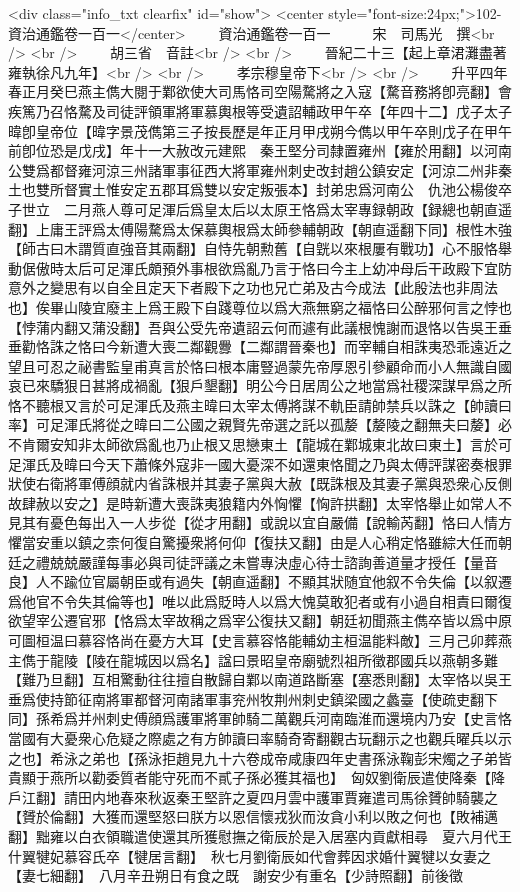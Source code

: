 <div class="info_txt clearfix" id="show">
<center style="font-size:24px;">102-資治通鑑卷一百一</center>
  　　資治通鑑卷一百一　　　宋　司馬光　撰<br />
<br />
　　胡三省　音註<br />
<br />
　　晉紀二十三【起上章涒灘盡著雍執徐凡九年】<br />
<br />
　　孝宗穆皇帝下<br />
<br />
　　升平四年春正月癸巳燕主儁大閱于鄴欲使大司馬恪司空陽騖將之入寇【騖音務將卽亮翻】會疾篤乃召恪騖及司徒評領軍將軍慕輿根等受遺詔輔政甲午卒【年四十二】戊子太子暐卽皇帝位【暐字景茂儁第三子按長歷是年正月甲戌朔今儁以甲午卒則戊子在甲午前卽位恐是戊戌】年十一大赦改元建熙　秦王堅分司隸置雍州【雍於用翻】以河南公雙爲都督雍河涼三州諸軍事征西大將軍雍州刺史改封趙公鎮安定【河涼二州非秦土也雙所督實土惟安定五郡耳爲雙以安定叛張本】封弟忠爲河南公　仇池公楊俊卒子世立　二月燕人尊可足渾后爲皇太后以太原王恪爲太宰專録朝政【録總也朝直遥翻】上庸王評爲太傅陽騖爲太保慕輿根爲太師參輔朝政【朝直遥翻下同】根性木強【師古曰木謂質直強音其兩翻】自恃先朝勲舊【自皝以來根屢有戰功】心不服恪舉動倨傲時太后可足渾氏頗預外事根欲爲亂乃言于恪曰今主上幼冲母后干政殿下宜防意外之變思有以自全且定天下者殿下之功也兄亡弟及古今成法【此殷法也非周法也】俟畢山陵宜廢主上爲王殿下自踐尊位以爲大燕無窮之福恪曰公醉邪何言之悖也【悖蒲内翻又蒲没翻】吾與公受先帝遺詔云何而遽有此議根愧謝而退恪以告吳王垂垂勸恪誅之恪曰今新遭大喪二鄰觀釁【二鄰謂晉秦也】而宰輔自相誅夷恐乖遠近之望且可忍之祕書監皇甫真言於恪曰根本庸豎過蒙先帝厚恩引參顧命而小人無識自國哀已來驕狠日甚將成禍亂【狠戶墾翻】明公今日居周公之地當爲社稷深謀早爲之所恪不聽根又言於可足渾氏及燕主暐曰太宰太傅將謀不軌臣請帥禁兵以誅之【帥讀曰率】可足渾氏將從之暐曰二公國之親賢先帝選之託以孤嫠【嫠陵之翻無夫曰嫠】必不肯爾安知非太師欲爲亂也乃止根又思戀東土【龍城在鄴城東北故曰東土】言於可足渾氏及暐曰今天下蕭條外寇非一國大憂深不如還東恪聞之乃與太傅評謀密奏根罪狀使右衛將軍傅顔就内省誅根并其妻子黨與大赦【既誅根及其妻子黨與恐衆心反側故肆赦以安之】是時新遭大喪誅夷狼籍内外恟懼【恟許拱翻】太宰恪舉止如常人不見其有憂色每出入一人步從【從才用翻】或說以宜自嚴備【說輸芮翻】恪曰人情方懼當安重以鎮之柰何復自驚擾衆將何仰【復扶又翻】由是人心稍定恪雖綜大任而朝廷之禮兢兢嚴謹每事必與司徒評議之未嘗專決虛心待士諮詢善道量才授任【量音良】人不踰位官屬朝臣或有過失【朝直遥翻】不顯其狀随宜他叙不令失倫【以叙遷爲他官不令失其倫等也】唯以此爲貶時人以爲大愧莫敢犯者或有小過自相責曰爾復欲望宰公遷官邪【恪爲太宰故稱之爲宰公復扶又翻】朝廷初聞燕主儁卒皆以爲中原可圖桓温曰慕容恪尚在憂方大耳【史言慕容恪能輔幼主桓温能料敵】三月己卯葬燕主儁于龍陵【陵在龍城因以爲名】諡曰景昭皇帝廟號烈祖所徵郡國兵以燕朝多難【難乃旦翻】互相驚動往往擅自散歸自鄴以南道路斷塞【塞悉則翻】太宰恪以吳王垂爲使持節征南將軍都督河南諸軍事兖州牧荆州刺史鎮梁國之蠡臺【使疏吏翻下同】孫希爲并州刺史傅顔爲護軍將軍帥騎二萬觀兵河南臨淮而還境内乃安【史言恪當國有大憂衆心危疑之際處之有方帥讀曰率騎奇寄翻觀古玩翻示之也觀兵曜兵以示之也】希泳之弟也【孫泳拒趙見九十六卷成帝咸康四年史書孫泳鞠彭宋燭之子弟皆貴顯于燕所以勸委質者能守死而不貳子孫必獲其福也】　匈奴劉衛辰遣使降秦【降戶江翻】請田内地春來秋返秦王堅許之夏四月雲中護軍賈雍遣司馬徐贇帥騎襲之【贇於倫翻】大獲而還堅怒曰朕方以恩信懷戎狄而汝貪小利以敗之何也【敗補邁翻】黜雍以白衣領職遣使還其所獲慰撫之衛辰於是入居塞内貢獻相尋　夏六月代王什翼犍妃慕容氏卒【犍居言翻】　秋七月劉衛辰如代會葬因求婚什翼犍以女妻之【妻七細翻】　八月辛丑朔日有食之既　謝安少有重名【少詩照翻】前後徵